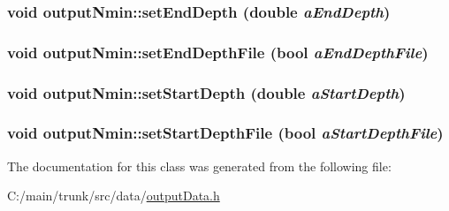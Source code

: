 \hypertarget{classoutput_nmin_aa5167e0b3600262feb29e563096b0d9a}{
\subsubsection[{setEndDepth}]{\setlength{\rightskip}{0pt plus 5cm}void outputNmin::setEndDepth (double {\em aEndDepth})}}
\label{classoutput_nmin_aa5167e0b3600262feb29e563096b0d9a}
\hypertarget{classoutput_nmin_aea2f9d9bdb9c36f106a21e2c87569396}{
\subsubsection[{setEndDepthFile}]{\setlength{\rightskip}{0pt plus 5cm}void outputNmin::setEndDepthFile (bool {\em aEndDepthFile})}}
\label{classoutput_nmin_aea2f9d9bdb9c36f106a21e2c87569396}
\hypertarget{classoutput_nmin_a7e1e189090ae756a84bf75b3055b4458}{
\subsubsection[{setStartDepth}]{\setlength{\rightskip}{0pt plus 5cm}void outputNmin::setStartDepth (double {\em aStartDepth})}}
\label{classoutput_nmin_a7e1e189090ae756a84bf75b3055b4458}
\hypertarget{classoutput_nmin_a968dc4cfe2b4420becc78d732416cf90}{
\subsubsection[{setStartDepthFile}]{\setlength{\rightskip}{0pt plus 5cm}void outputNmin::setStartDepthFile (bool {\em aStartDepthFile})}}
\label{classoutput_nmin_a968dc4cfe2b4420becc78d732416cf90}


The documentation for this class was generated from the following file:\begin{DoxyCompactItemize}
\item 
C:/main/trunk/src/data/\hyperlink{output_data_8h}{outputData.h}\end{DoxyCompactItemize}
